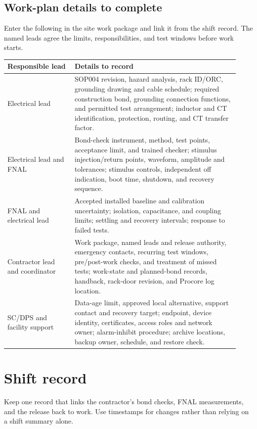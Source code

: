 \documentclass[11pt]{article}
\begin{document}
\subsection{Work-plan details to complete}

Enter the following in the site work package and link it from the shift record. The named leads agree the limits, responsibilities, and test windows before work starts.

\begin{longtable}{@{}L{0.27\linewidth}L{0.66\linewidth}@{}}
\toprule
Responsible lead & Details to record \\
\midrule
\endhead
Electrical lead & SOP004 revision, hazard analysis, rack ID/ORC, grounding drawing and cable schedule; required construction bond, grounding connection functions, and permitted test arrangement; inductor and CT identification, protection, routing, and CT transfer factor. \\
Electrical lead and FNAL & Bond-check instrument, method, test points, acceptance limit, and trained checker; stimulus injection/return points, waveform, amplitude and tolerances; stimulus controls, independent off indication, boot time, shutdown, and recovery sequence. \\
FNAL and electrical lead & Accepted installed baseline and calibration uncertainty; isolation, capacitance, and coupling limits; settling and recovery intervals; response to failed tests. \\
Contractor lead and coordinator & Work package, named leads and release authority, emergency contacts, recurring test windows, pre/post-work checks, and treatment of missed tests; work-state and planned-bond records, handback, rack-door revision, and Procore log location. \\
SC/DPS and facility support & Data-age limit, approved local alternative, support contact and recovery target; endpoint, device identity, certificates, access roles and network owner; alarm-inhibit procedure; archive locations, backup owner, schedule, and restore check. \\
\bottomrule
\end{longtable}

\section{Shift record}

Keep one record that links the contractor's bond checks, FNAL measurements, and the release back to work. Use timestamps for changes rather than relying on a shift summary alone.
\end{document}

